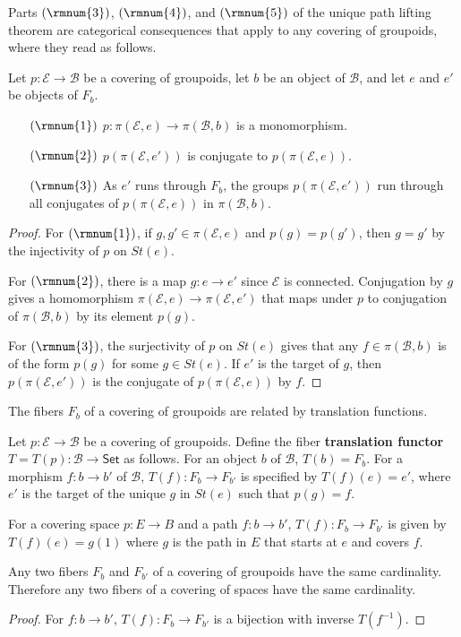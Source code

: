 Parts $(\rmnum{3})$, $(\rmnum{4})$, and $(\rmnum{5})$ of the unique path lifting theorem are categorical consequences that apply to any covering of groupoids, where they read as follows.
\begin{proposition}
Let $p:\mathcal{E}\to\mathcal{B}$ be a covering of groupoids, let $b$ be an object of $\mathcal{B}$, and let $e$ and $e'$ be objects of $F_b$.
\begin{itemize}
\item[$(\rmnum{1})$] $p:\pi(\mathcal{E},e)\to\pi(\mathcal{B},b)$ is a monomorphism.
\item[$(\rmnum{2})$] $p(\pi(\mathcal{E},e'))$ is conjugate to $p(\pi(\mathcal{E},e))$.
\item[$(\rmnum{3})$] As $e'$ runs through $F_b$, the groups $p(\pi(\mathcal{E},e'))$ run through all conjugates of $p(\pi(\mathcal{E},e))$ in $\pi(\mathcal{B},b)$.
\end{itemize}
\end{proposition}
\begin{proof}
For $(\rmnum{1})$, if $g,g'\in\pi(\mathcal{E},e)$ and $p(g)=p(g')$, then $g=g'$ by the injectivity of $p$ on $St(e)$.\par 
For $(\rmnum{2})$, there is a map $g:e\to e'$ since $\mathcal{E}$ is connected. Conjugation by $g$ gives a homomorphism $\pi(\mathcal{E},e)\to\pi(\mathcal{E},e')$ that maps under $p$ to conjugation
of $\pi(\mathcal{B},b)$ by its element $p(g)$.\par
For $(\rmnum{3})$, the surjectivity of $p$ on $St(e)$ gives that any $f\in\pi(\mathcal{B},b)$ is of the form $p(g)$ for some $g\in St(e)$. If $e'$ is the target of $g$, then $p(\pi(\mathcal{E},e'))$ is the conjugate of $p(\pi(\mathcal{E},e))$ by $f$.
\end{proof}
The fibers $F_b$ of a covering of groupoids are related by translation functions.
\begin{definition}
Let $p:\mathcal{E}\to\mathcal{B}$ be a covering of groupoids. Define the fiber
\textbf{translation functor} $T=T(p):\mathcal{B}\to\mathsf{Set}$ as follows. For an object $b$ of $\mathcal{B}$, $T(b)=F_b$. For a morphism $f:b\to b'$ of $\mathcal{B}$, $T(f):F_b\to F_{b'}$ is specified by $T(f)(e)=e'$, where $e'$ is the target of the unique $g$ in $St(e)$ such that $p(g)=f$.
\end{definition}
For a covering space $p:E\to B$ and a path $f:b\to b'$, $T(f):F_b\to F_{b'}$ is given by $T(f)(e)=g(1)$ where $g$ is the path in $E$ that starts at $e$ and covers $f$.
\begin{proposition}
Any two fibers $F_b$ and $F_{b'}$ of a covering of groupoids have the same cardinality. Therefore any two fibers of a covering of spaces have the same
cardinality.
\end{proposition}
\begin{proof}
For $f:b\to b'$, $T(f):F_b\to F_{b'}$ is a bijection with inverse $T(f^{-1})$.
\end{proof}
